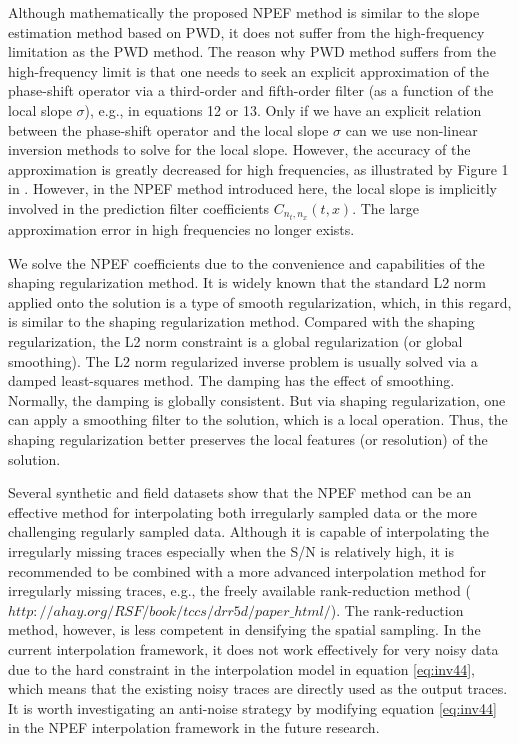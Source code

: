 Although mathematically the proposed NPEF method is similar to the slope estimation method based on PWD, it does not suffer from the high-frequency limitation as the PWD method.  The reason why PWD method suffers from the high-frequency limit is that one needs to seek an explicit approximation of the phase-shift operator via a third-order and fifth-order filter (as a function of the local slope $\sigma$), e.g., in equations 12 or 13. Only if we have an explicit relation between the phase-shift operator and the local slope $\sigma$ can we use non-linear inversion methods to solve for the local slope. However, the accuracy of the approximation is greatly decreased for high frequencies, as illustrated by Figure 1 in \cite{fomel2002pwd}. However, in the NPEF method introduced here, the local slope is implicitly involved in the prediction filter coefficients $C_{n_t,n_x}(t,x)$. The large approximation error in high frequencies no longer exists.%

We solve the NPEF coefficients due to the convenience and capabilities of the shaping regularization method. It is widely known that the standard L2 norm applied onto the solution is a type of smooth regularization, which, in this regard, is similar to the shaping regularization method. Compared with the shaping regularization, the L2 norm constraint is a global regularization (or global smoothing). The L2 norm regularized inverse problem is usually solved via a damped least-squares method. The damping has the effect of smoothing. Normally, the damping is globally consistent. But via shaping regularization, one can apply a smoothing filter to the solution, which is a local operation. Thus, the shaping regularization better preserves the local features (or resolution) of the solution.

Several synthetic and field datasets show that the NPEF method can be an effective method for interpolating both irregularly sampled data or the more challenging regularly sampled data. Although it is capable of interpolating the irregularly missing traces especially when the S/N is relatively high, it is recommended to be combined with a more advanced interpolation method for irregularly missing traces, e.g., the freely available rank-reduction method ($http://ahay.org/RSF/book/tccs/drr5d/paper\_html/$). The rank-reduction method, however, is less competent in densifying the spatial sampling. In the current interpolation framework, it does not work effectively for very noisy data due to the hard constraint in the interpolation model in equation \ref{eq:inv44}, which means that the existing noisy traces are directly used as the output traces. It is worth investigating an anti-noise strategy by modifying equation \ref{eq:inv44} in the NPEF interpolation framework in the future research.  


